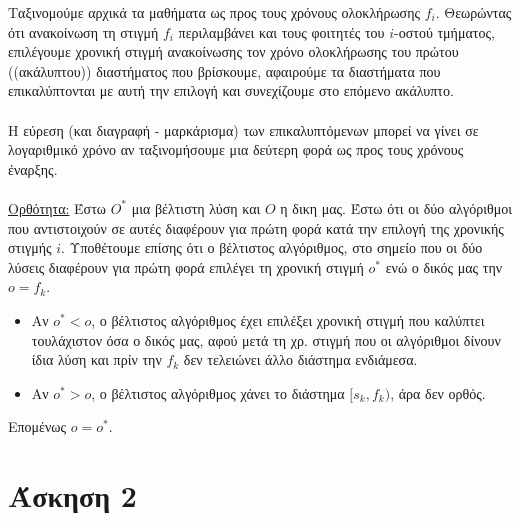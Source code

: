 \documentclass[12pt,a4paper]{article}
\begin{document}
    Ταξινομούμε αρχικά τα μαθήματα ως προς τους χρόνους ολοκλήρωσης \( f_i \).
    Θεωρώντας ότι ανακοίνωση τη στιγμή \( f_i \) περιλαμβάνει και τους φοιτητές
    του \( i \)-οστού τμήματος, επιλέγουμε χρονική στιγμή ανακοίνωσης τον 
    χρόνο ολοκλήρωσης του πρώτου ((ακάλυπτου)) διαστήματος που βρίσκουμε,
    αφαιρούμε τα διαστήματα που επικαλύπτονται με αυτή την επιλογή και
    συνεχίζουμε στο επόμενο ακάλυπτο.\\
    \\
    Η εύρεση (και διαγραφή - μαρκάρισμα) των επικαλυπτόμενων μπορεί να γίνει σε
    λογαριθμικό χρόνο αν ταξινομήσουμε μια δεύτερη φορά ως προς τους χρόνους
    έναρξης.\\
    \\
    \underline{Ορθότητα:} Έστω \( O^{*} \) μια βέλτιστη λύση και \( Ο \) η δικη
    μας. Έστω ότι οι δύο αλγόριθμοι που αντιστοιχούν σε αυτές διαφέρουν για
    πρώτη φορά κατά την επιλογή της χρονικής στιγμής \( i \). Υποθέτουμε επίσης
    ότι ο βέλτιστος αλγόριθμος, στο σημείο που οι δύο λύσεις διαφέρουν για πρώτη
    φορά επιλέγει τη χρονική στιγμή \( ο^{*} \) ενώ ο δικός μας την \( ο = f_k 
    \).
    \begin{itemize}
      \item Αν \( o^{*} < o \), ο βέλτιστος αλγόριθμος έχει επιλέξει χρονική
            στιγμή που καλύπτει τουλάχιστον όσα ο δικός μας, αφού μετά τη χρ.
            στιγμή που οι αλγόριθμοι δίνουν ίδια λύση και πρίν την
            \( f_k \) δεν τελειώνει άλλο διάστημα ενδιάμεσα.
      \item Αν \( o^{*} > o \), ο βέλτιστος αλγόριθμος χάνει το διάστημα
            \( [s_k, f_k) \), άρα δεν ορθός.
    \end{itemize}
    Επομένως \( ο = ο^{*} \).
  
  \section{Άσκηση 2}
\end{document}
